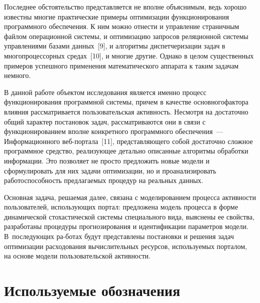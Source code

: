 \begin{multicols}{2}
  Последнее обстоятельство представляется не вполне объяснимым, ведь хорошо известны 
многие практические примеры оптимизации функционирования программного обеспечения. 
К ним можно отнести и управление страничным файлом операционной сис\-те\-мы, и 
оптимизацию запросов реляционной сис\-те\-мы управ\-ле\-ни\-ями базами данных~[9], и 
алгоритмы диспетчеризации задач в многопроцессорных средах~[10], и многие другие. 
Однако в целом существенных примеров успешного применения математического аппарата 
к таким задачам немного.
  
  В данной работе объектом исследования является именно процесс функционирования 
про\-грам\-мной сис\-те\-мы, причем в качестве основного\linebreak факто\-ра влияния рассматривается 
пользовательская актив\-ность. Несмотря на достаточно общий характер постановок задач, 
рассматриваются они в связи с функционированием вполне конкретного программного 
обеспечения~--- Информационного веб-пор\-та\-ла~[11], представляющего собой достаточно 
сложное программное средство, реализующее детально описанные алгоритмы обработки 
информации. Это позволяет не просто предложить новые модели и сформулировать для них 
задачи оптимизации, но и проанализировать работоспособность предлагаемых процедур на 
реальных данных.
  
  Основная задача, решаемая далее, связана с моделированием процесса активности 
пользователей, использующих портал: предложена модель процесса в форме динамической 
стохастической сис\-те\-мы специального вида, выяснены ее свойства, разработаны процедуры 
прогнозирования и идентификации параметров модели. В~последующих ра-\linebreak ботах будут 
представлены постановки и решения задач оптимизации расходования вычислительных 
ресурсов, используемых порталом, на основе модели пользовательской активности.

\section{Используемые обозначения}
  

\end{multicols}
